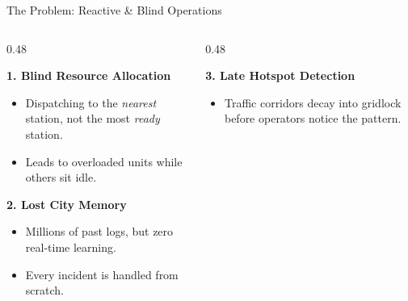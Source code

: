 \documentclass[aspectratio=169, xcolor=table]{beamer}
\begin{document}
\begin{frame}{The Problem: Reactive \& Blind Operations}
    \vspace{0.5cm}
    \begin{columns}[T]
        \begin{column}{0.48\textwidth}
            \begin{tcolorbox}[sentinelcard, height=5.5cm]
                \textcolor{SentinelDanger}{\textbf{1. Blind Resource Allocation}}
                \vspace{0.2cm}
                \begin{itemize}
                    \item Dispatching to the \textit{nearest} station, not the most \textit{ready} station.
                    \item Leads to overloaded units while others sit idle.
                \end{itemize}
                \vspace{0.4cm}
                
                \textcolor{SentinelDanger}{\textbf{2. Lost City Memory}}
                \vspace{0.2cm}
                \begin{itemize}
                    \item Millions of past logs, but zero real-time learning.
                    \item Every incident is handled from scratch.
                \end{itemize}
            \end{tcolorbox}
        \end{column}
        
        \begin{column}{0.48\textwidth}
            \begin{tcolorbox}[sentinelcard, height=5.5cm]
                \textcolor{SentinelDanger}{\textbf{3. Late Hotspot Detection}}
                \vspace{0.2cm}
                \begin{itemize}
                    \item Traffic corridors decay into gridlock before operators notice the pattern.
                \end{itemize}
                \vspace{0.4cm}
                

\end{tcolorbox}
\end{column}
\end{columns}
\end{frame}
\end{document}
